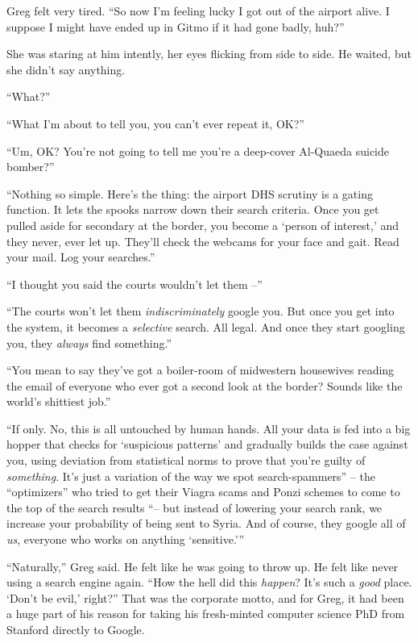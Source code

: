 Greg felt very tired. “So now I'm feeling lucky I got out of the 
airport alive. I suppose I might have ended up in Gitmo if it had gone 
badly, huh?”

She was staring at him intently, her eyes flicking from side to side. 
He waited, but she didn't say anything.

“What?”

“What I'm about to tell you, you can't ever repeat it, OK?”

“Um, OK? You're not going to tell me you're a deep-cover Al-Quaeda 
suicide bomber?”

“Nothing so simple. Here's the thing: the airport DHS scrutiny is a 
gating function. It lets the spooks narrow down their search criteria. 
Once you get pulled aside for secondary at the border, you become a 
`person of interest,' and they never, ever let up. They'll check the 
webcams for your face and gait. Read your mail. Log your searches.”

“I thought you said the courts wouldn't let them --”

“The courts won't let them \emph{indiscriminately} google you. But 
once you get into the system, it becomes a \emph{selective} search. All 
legal. And once they start googling you, they \emph{always} find 
something.”

“You mean to say they've got a boiler-room of midwestern housewives 
reading the email of everyone who ever got a second look at the border? 
Sounds like the world's shittiest job.”

“If only. No, this is all untouched by human hands. All your data is 
fed into a big hopper that checks for `suspicious patterns' and 
gradually builds the case against you, using deviation from statistical 
norms to prove that you're guilty of \emph{something}. It's just a 
variation of the way we spot search-spammers” -- the “optimizers” 
who tried to get their Viagra scams and Ponzi schemes to come to the 
top of the search results “-- but instead of lowering your search 
rank, we increase your probability of being sent to Syria. And of 
course, they google all of \emph{us}, everyone who works on anything 
`sensitive.'”

“Naturally,” Greg said. He felt like he was going to throw up. He 
felt like never using a search engine again. “How the hell did this 
\emph{happen}? It's such a \emph{good} place. `Don't be evil,' 
right?” That was the corporate motto, and for Greg, it had been a 
huge part of his reason for taking his fresh-minted computer science 
PhD from Stanford directly to Google.

